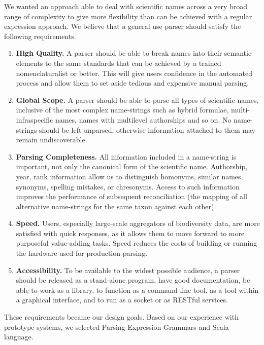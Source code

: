 \documentclass{bmcart}
\begin{document}
We wanted an approach able to deal with scientific names across a very broad range of complexity to give more flexibility than can be achieved with a regular expression approach. We believe that a general use parser should satisfy the following requirements.

\begin{enumerate}

  \item \textbf{High Quality.} A parser should be able to break names into their semantic elements to the same standards that can be achieved by a trained nomenclaturalist or better. This will give users confidence in the automated process and allow them to set aside tedious and expensive manual parsing.

  \item \textbf{Global Scope.} A parser should be able to parse all types of scientific names, inclusive of the most complex name-strings such as hybrid formulae, multi-infraspecific names, names with multilevel authorships and so on. No name-strings should be left unparsed, otherwise information attached to them may remain undiscoverable.

  \item \textbf{Parsing Completeness.} All information included in a name-string is important, not only the canonical form of the scientific name. Authorship, year, rank information allow us to distinguish homonyms, similar names, synonyms, spelling mistakes, or chresonyms. Access to such information improves the performance of subsequent reconciliation (the mapping of all alternative name-strings for the same taxon against each other).

  \item \textbf{Speed.} Users, especially large-scale aggregators of biodiversity data, are more satisfied with quick responses, as it allows them to move forward to more purposeful value-adding tasks. Speed reduces the costs of building or running the hardware used for production parsing.

  \item \textbf{Accessibility.} To be available to the widest possible audience, a parser should be released as a stand-alone program, have good documentation, be able to work as a library, to function as a command line tool, as a tool within a graphical interface, and to run as a socket or as RESTful services.

\end{enumerate}

These requirements became our design goals. Based on our experience with prototype systems, we selected Parsing Expression Grammars and Scala language.
\end{document}
